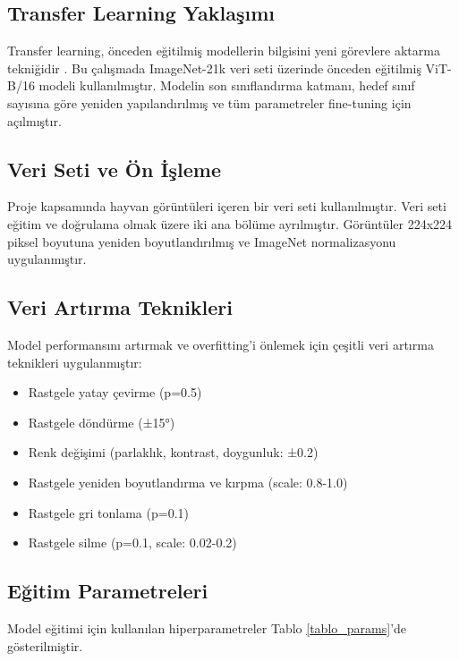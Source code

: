 \documentclass[conference, a4paper]{IEEEtran}
\begin{document}
	\subsection{Transfer Learning Yaklaşımı}
	
	Transfer learning, önceden eğitilmiş modellerin bilgisini yeni görevlere aktarma tekniğidir \cite{pan2009survey}. Bu çalışmada ImageNet-21k veri seti üzerinde önceden eğitilmiş ViT-B/16 modeli kullanılmıştır. Modelin son sınıflandırma katmanı, hedef sınıf sayısına göre yeniden yapılandırılmış ve tüm parametreler fine-tuning için açılmıştır.
	
	\subsection{Veri Seti ve Ön İşleme}
	
	Proje kapsamında hayvan görüntüleri içeren bir veri seti kullanılmıştır. Veri seti eğitim ve doğrulama olmak üzere iki ana bölüme ayrılmıştır. Görüntüler 224x224 piksel boyutuna yeniden boyutlandırılmış ve ImageNet normalizasyonu uygulanmıştır.
	
	\subsection{Veri Artırma Teknikleri}
	
	Model performansını artırmak ve overfitting'i önlemek için çeşitli veri artırma teknikleri uygulanmıştır:
	
	\begin{itemize}
		\item Rastgele yatay çevirme (p=0.5)
		\item Rastgele döndürme (±15°)
		\item Renk değişimi (parlaklık, kontrast, doygunluk: ±0.2)
		\item Rastgele yeniden boyutlandırma ve kırpma (scale: 0.8-1.0)
		\item Rastgele gri tonlama (p=0.1)
		\item Rastgele silme (p=0.1, scale: 0.02-0.2)
	\end{itemize}
	
	\subsection{Eğitim Parametreleri}
	
	Model eğitimi için kullanılan hiperparametreler Tablo \ref{tablo_params}'de gösterilmiştir.
	
\end{document}
